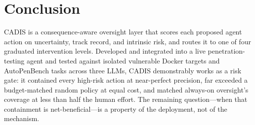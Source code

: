 \documentclass[11pt]{article}
\begin{document}
\section{Conclusion}
CADIS is a consequence-aware oversight layer that scores each proposed agent action on uncertainty,
track record, and intrinsic risk, and routes it to one of four graduated intervention levels. Developed
and integrated into a live penetration-testing agent and tested against isolated vulnerable Docker
targets and AutoPenBench tasks across three LLMs, CADIS demonstrably works as a risk gate: it contained
every high-risk action at near-perfect precision, far exceeded a budget-matched random policy at equal
cost, and matched always-on oversight's coverage at less than half the human effort. The remaining
question---when that containment is net-beneficial---is a property of the deployment, not of the
mechanism.



\end{document}
